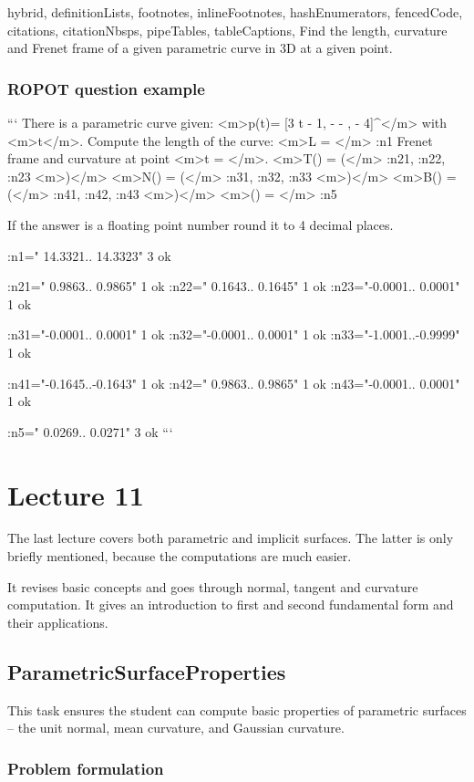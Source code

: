 \begin{markdown*}{%
  hybrid,
  definitionLists,
  footnotes,
  inlineFootnotes,
  hashEnumerators,
  fencedCode,
  citations,
  citationNbsps,
  pipeTables,
  tableCaptions,
}
Find the length, curvature and Frenet frame of a given parametric curve in 3D at a given point.

\subsubsection{ROPOT question example}

```
There is a parametric curve given: <m>p(t)=
[3 t - 1, -  - , 
 - 4]^\top</m> 
with <m>t\in [0, \frac{3 \pi}{2}]</m>.
Compute the length of the curve:
<m>L = </m> :n1
Frenet frame and curvature at point <m>t = \pi</m>.
<m>T(\pi) = (</m> :n21, :n22, :n23 <m>)</m>
<m>N(\pi) = (</m> :n31, :n32, :n33 <m>)</m>
<m>B(\pi) = (</m> :n41, :n42, :n43 <m>)</m>
<m>\kappa(\pi) = </m> :n5

If the answer is a floating point number 
round it to 4 decimal places.

:n1=" 14.3321.. 14.3323" 3 ok

:n21=" 0.9863.. 0.9865" 1 ok
:n22=" 0.1643.. 0.1645" 1 ok
:n23="-0.0001.. 0.0001" 1 ok

:n31="-0.0001.. 0.0001" 1 ok
:n32="-0.0001.. 0.0001" 1 ok
:n33="-1.0001..-0.9999" 1 ok

:n41="-0.1645..-0.1643" 1 ok
:n42=" 0.9863.. 0.9865" 1 ok
:n43="-0.0001.. 0.0001" 1 ok

:n5=" 0.0269.. 0.0271" 3 ok
```

\section{Lecture 11}

The last lecture covers both parametric and implicit surfaces. The latter is only briefly mentioned, because the computations are much easier. 

It revises basic concepts and goes through normal, tangent and curvature computation. It gives an introduction to first and second fundamental form and their applications.

\subsection{ParametricSurfaceProperties}

This task ensures the student can compute basic properties of parametric surfaces -- the unit normal, mean curvature, and Gaussian curvature.

\subsubsection{Problem formulation}


\end{markdown*}
